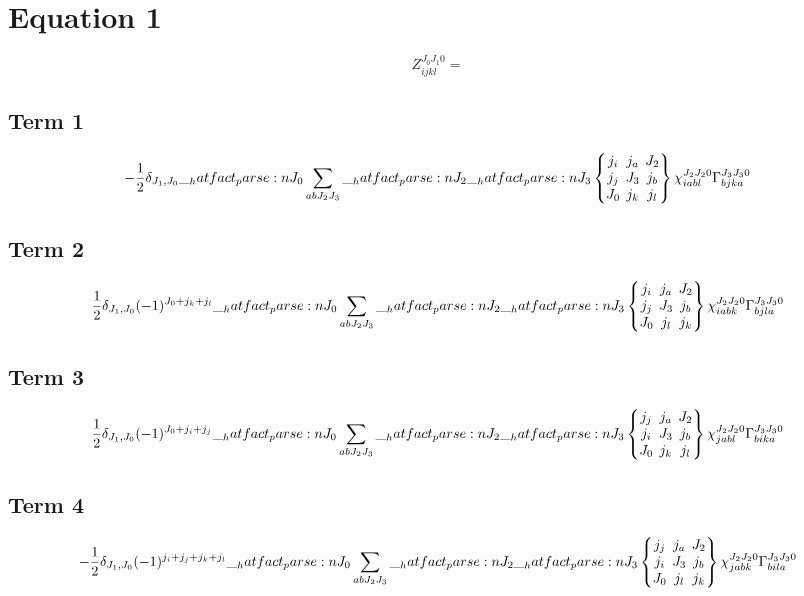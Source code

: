 \documentclass{scrartcl}
\newcommand{\ninej}[9]{\begingroup\setlength{\arraycolsep}{0.2em}\begin{Bmatrix} #1 & #2 & #3 \\ #4 & #5 & #6 \\ #7 & #8 & #9 \end{Bmatrix}\endgroup}
\begin{document}
\section{Equation 1}
\begin{dmath*}
Z_{i j k l}^{{J}_{0} {J}_{1} 0} = 
\end{dmath*}
\subsection{Term 1}
\begin{dmath*}
-\frac{1}{2} \* \delta_{{J}_{1},{J}_{0}} \* \hatfact{{J}_{0}} \* \sum_{a b {J}_{2} {J}_{3}} \* \hatfact{{J}_{2}} \* \hatfact{{J}_{3}} \* \ninej{{j}_{i}}{{j}_{a}}{{J}_{2}}{{j}_{j}}{{J}_{3}}{{j}_{b}}{{J}_{0}}{{j}_{k}}{{j}_{l}} \* \chi_{i a b l}^{{J}_{2} {J}_{2} 0} \* \Gamma_{b j k a}^{{J}_{3} {J}_{3} 0}
\end{dmath*}
\subsection{Term 2}
\begin{dmath*}
\frac{1}{2} \* \delta_{{J}_{1},{J}_{0}} \* (-1)^{{J}_{0}+{j}_{k}+{j}_{l}} \* \hatfact{{J}_{0}} \* \sum_{a b {J}_{2} {J}_{3}} \* \hatfact{{J}_{2}} \* \hatfact{{J}_{3}} \* \ninej{{j}_{i}}{{j}_{a}}{{J}_{2}}{{j}_{j}}{{J}_{3}}{{j}_{b}}{{J}_{0}}{{j}_{l}}{{j}_{k}} \* \chi_{i a b k}^{{J}_{2} {J}_{2} 0} \* \Gamma_{b j l a}^{{J}_{3} {J}_{3} 0}
\end{dmath*}
\subsection{Term 3}
\begin{dmath*}
\frac{1}{2} \* \delta_{{J}_{1},{J}_{0}} \* (-1)^{{J}_{0}+{j}_{i}+{j}_{j}} \* \hatfact{{J}_{0}} \* \sum_{a b {J}_{2} {J}_{3}} \* \hatfact{{J}_{2}} \* \hatfact{{J}_{3}} \* \ninej{{j}_{j}}{{j}_{a}}{{J}_{2}}{{j}_{i}}{{J}_{3}}{{j}_{b}}{{J}_{0}}{{j}_{k}}{{j}_{l}} \* \chi_{j a b l}^{{J}_{2} {J}_{2} 0} \* \Gamma_{b i k a}^{{J}_{3} {J}_{3} 0}
\end{dmath*}
\subsection{Term 4}
\begin{dmath*}
-\frac{1}{2} \* \delta_{{J}_{1},{J}_{0}} \* (-1)^{{j}_{i}+{j}_{j}+{j}_{k}+{j}_{l}} \* \hatfact{{J}_{0}} \* \sum_{a b {J}_{2} {J}_{3}} \* \hatfact{{J}_{2}} \* \hatfact{{J}_{3}} \* \ninej{{j}_{j}}{{j}_{a}}{{J}_{2}}{{j}_{i}}{{J}_{3}}{{j}_{b}}{{J}_{0}}{{j}_{l}}{{j}_{k}} \* \chi_{j a b k}^{{J}_{2} {J}_{2} 0} \* \Gamma_{b i l a}^{{J}_{3} {J}_{3} 0}
\end{dmath*}
\end{document}
